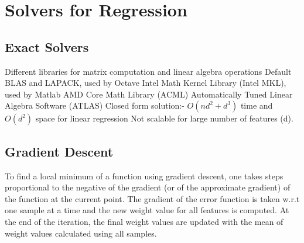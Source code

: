\documentclass{sigplanconf}
\begin{document}
\section{Solvers for Regression}
\subsection{Exact Solvers}
Different libraries for matrix computation and linear algebra operations
Default BLAS and LAPACK, used by Octave
Intel Math Kernel Library (Intel MKL), used by Matlab
AMD Core Math Library (ACML)
Automatically Tuned Linear Algebra Software (ATLAS)
Closed form solution:- \begin {math} O(nd^2 + d^3) \end {math} time and \begin {math} O(d^2) \end {math} space for linear regression
Not scalable for large number of features (d).

\subsection{Gradient Descent}
To find a local minimum of a function using gradient descent, one takes steps proportional to the negative of 
the gradient (or of the approximate gradient) of the function at the current point. The gradient of the error 
function is taken w.r.t one sample at a time and the new weight value for all features is computed.
At the end of the iteration, the final weight values are updated with the mean of weight values calculated using all samples.
\end{document}
